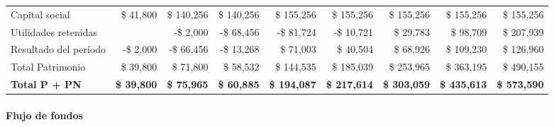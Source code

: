 \begin{center}
\begin{adjustbox}{width=\textwidth,center}
\begin{tabular}{l|rrrrrrrr}
\hline
Capital social & \$ 41,800 & \$ 140,256 & \$ 140,256 & \$ 155,256 & \$ 155,256 & \$ 155,256 & \$ 155,256 & \$ 155,256 \\
Utilidades retenidas & & -\$ 2,000 & -\$ 68,456 & -\$ 81,724 & -\$ 10,721 & \$ 29,783 & \$ 98,709 & \$ 207,939 \\
Resultado del período & -\$ 2,000 & -\$ 66,456 & -\$ 13,268 & \$ 71,003 & \$ 40,504 & \$ 68,926 & \$ 109,230 & \$ 126,960 \\
\hline
Total Patrimonio & \$ 39,800 & \$ 71,800 & \$ 58,532 & \$ 144,535 & \$ 185,039 & \$ 253,965 & \$ 363,195 & \$ 490,155 \\
\hline
\hline
\textbf{Total P + PN} & \textbf{\$ 39,800} & \textbf{\$ 75,965} & \textbf{\$ 60,885} & \textbf{\$ 194,087} & \textbf{\$ 217,614} & \textbf{\$ 303,059} & \textbf{\$ 435,613} & \textbf{\$ 573,590} \\
\hline
\end{tabular}
\end{adjustbox}
\end{center}

\clearpage


\paragraph{Flujo de fondos}

